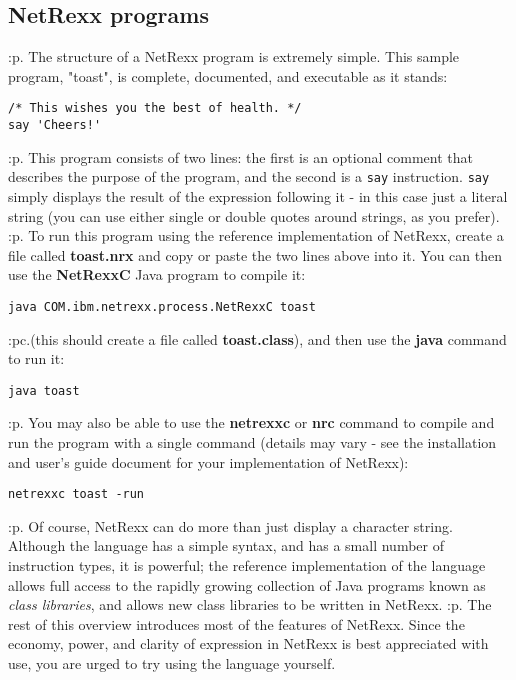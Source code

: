 \subsection{NetRexx programs}\label{refoprogs}
:p.
The structure of a NetRexx program is extremely simple.  This sample
program, "toast", is complete, documented, and executable as it
stands:
\begin{verbatim}
/* This wishes you the best of health. */
say 'Cheers!'
\end{verbatim}
:p.
This program consists of two lines: the first is an optional
comment that describes the purpose of the program, and the second is a
\texttt{say} instruction.  \texttt{say} simply displays the result of
the expression following it - in this case just a literal string
(you can use either single or double quotes around strings, as you
prefer).
:p.
To run this program using the reference implementation of NetRexx,
create a file called \textbf{toast.nrx} and copy or paste the two
lines above into it.  You can then use the \textbf{NetRexxC} Java
program to compile it:
\begin{verbatim}
java COM.ibm.netrexx.process.NetRexxC toast
\end{verbatim}
:pc.(this should create a file called \textbf{toast.class}),
and then use the \textbf{java} command to run it:
\begin{verbatim}
java toast
\end{verbatim}
:p.
You may also be able to use the \textbf{netrexxc} or \textbf{nrc}
command to compile and run the program with a single command (details
may vary - see the installation and user's guide document for your
implementation of NetRexx):
\begin{verbatim}
netrexxc toast -run
\end{verbatim}
:p.
Of course, NetRexx can do more than just display a character string.
Although the language has a simple syntax, and has a small number of
instruction types, it is powerful; the reference implementation of the
language allows full access to the rapidly growing collection of Java
programs known as \emph{class libraries}, and allows new class
libraries to be written in NetRexx.
:p.
The rest of this overview introduces most of the features of NetRexx.
Since the economy, power, and clarity of expression in NetRexx is best
appreciated with use, you are urged to try using the language yourself.
